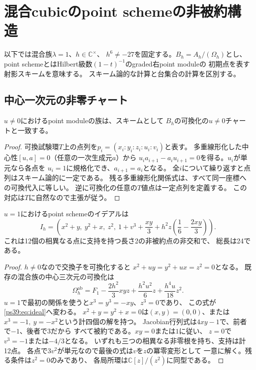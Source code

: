 \section{混合cubicのpoint schemeの非被約構造}
\label{ps39:sec}
以下では混合族$\lambda=1$、$h\in\mathbb C^\times$、
$h^6\ne-27$を固定する。$B_h=A_h/(\Omega_h)$とし、
point schemeとはHilbert級数$(1-t)^{-1}$のgraded右point moduleの
初期点を表す射影スキームを意味する。
スキーム論的な計算と台集合の計算を区別する。

\subsection{中心一次元の非零チャート}
\begin{lemma}[中心座標による点列の対角化]\label{ps39:lem:abelian}
$u\ne0$におけるpoint moduleの族は、スキームとして
$B_h$の可換化の$u\ne0$チャートと一致する。
\end{lemma}
\begin{proof}
可換試験環$T$上の点列を$p_i=(x_i:y_i:z_i:u_i:v_i)$と表す。
多重線形化した中心性$[u,a]=0$（任意の一次生成元$a$）から
$u_ia_{i+1}-a_iu_{i+1}=0$を得る。$u_i$が単元なら各点を
$u_i=1$に規格化でき、$a_{i+1}=a_i$となる。
全$i$について繰り返すと点列はスキーム論的に一定である。
残る多重線形化関係式は、すべて同一座標への可換代入に等しい。
逆に可換化の任意の$T$値点は一定点列を定義する。
この対応は$T$に自然なので主張が従う。
\end{proof}

\begin{proposition}\label{ps39:prop:length}
$u=1$におけるpoint schemeのイデアルは
\begin{equation}\label{ps39:eq:ideal}
I_h=\left(x^2+y,\ y^2+x,\ z^2,\
1+v^3+\frac{xy}{3}
+h^2z\left(\frac16-\frac{2xy}{3}\right)\right).
\end{equation}
これは12個の相異なる点に支持を持つ長さ2の非被約点の非交和で、
総長は24である。
\end{proposition}
\begin{proof}
$h\ne0$なので交換子を可換化すると
$x^2+uy=y^2+ux=z^2=0$となる。
既存の混合族の中心三次元の可換化は
\[
\Omega_h^{\mathrm{ab}}
=F_1-\frac{2h^2}{3}xyz+\frac{h^2u^2}{6}z
+\frac{h^4u}{18}z^2.
\]
$u=1$で最初の関係を使うと$x^3=y^3=-xy$、$z^3=0$であり、
この式が\eqref{ps39:eq:ideal}へ変わる。
$x^2+y=y^2+x=0$は$(x,y)=(0,0)$、または
$x^3=-1,\ y=-x^2$という計四個の解を持つ。
Jacobian行列式は$4xy-1$で、前者で$-1$、後者で$3$だから
すべて被約である。$xy=0$または$1$に従い、
$z=0$で$v^3=-1$または$-4/3$となる。
いずれも三つの相異なる非零根を持ち、支持は計12点。
各点で$3v^2$が単元なので最後の式は$v$を$z$の冪零変形として
一意に解く。残る条件は$z^2=0$のみであり、
各局所環は$\mathbb C[z]/(z^2)$に同型である。
\end{proof}

